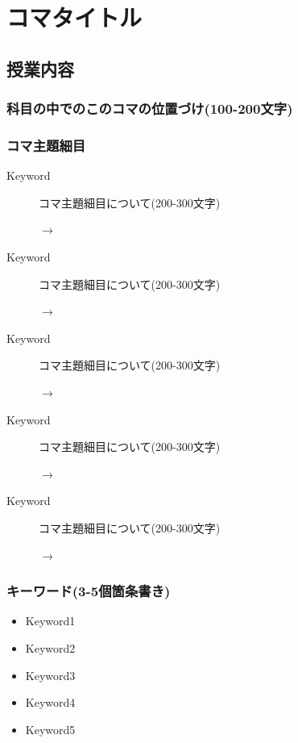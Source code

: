 \section{コマタイトル}
\subsection{授業内容}
\subsubsection{科目の中でのこのコマの位置づけ(100-200文字)}
\subsubsection{コマ主題細目}
\begin{description}
	\item[Keyword]コマ主題細目について(200-300文字)
	      \begin{flushright}
		      $\to$
	      \end{flushright}

	\item[Keyword]コマ主題細目について(200-300文字)
	      \begin{flushright}
		      $\to$
	      \end{flushright}

	\item[Keyword]コマ主題細目について(200-300文字)
	      \begin{flushright}
		      $\to$
	      \end{flushright}

	\item[Keyword]コマ主題細目について(200-300文字)
	      \begin{flushright}
		      $\to$
	      \end{flushright}

	\item[Keyword]コマ主題細目について(200-300文字)
	      \begin{flushright}
		      $\to$
	      \end{flushright}

\end{description}
\subsubsection{キーワード(3-5個箇条書き)}
\begin{itemize}
	\item Keyword1
	\item Keyword2
	\item Keyword3
	\item Keyword4
	\item Keyword5
\end{itemize}

